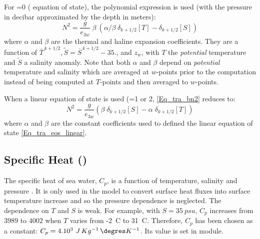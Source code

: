 For =0 (\citet{JackMcD1995} equation of state), the \citet{McDougall1987} 
polynomial expression is used (with the pressure in decibar approximated by 
the depth in meters): 
\begin{equation} \label{Eq_tra_bn2}
N^2 = \frac{g}{e_{3w}} \; \beta   \ 
	   \left(  \alpha / \beta \ \delta_{k+1/2}[T]     - \delta_{k+1/2}[S]   \right) 
\end{equation} 
where $\alpha$ and $\beta$ are the thermal and haline expansion coefficients. 
They are a function of  $\overline{T}^{\,k+1/2},\widetilde{S}=\overline{S}^{\,k+1/2} - 35.$, 
and  $z_w$, with $T$ the \textit{potential} temperature and $\widetilde{S}$ a salinity anomaly. 
Note that both $\alpha$ and $\beta$ depend on \textit{potential} 
temperature and salinity which are averaged at $w$-points prior 
to the computation instead of being computed at $T$-points and 
then averaged to $w$-points.

When a linear equation of state is used (=1 or 2, 
\eqref{Eq_tra_bn2} reduces to:
\begin{equation} \label{Eq_tra_bn2_linear}
N^2 =	\frac{g}{e_{3w}} \left(   \beta \;\delta_{k+1/2}[S] - \alpha \;\delta_{k+1/2}[T]   \right)
\end{equation} 
where $\alpha$ and $\beta $ are the constant coefficients used to 
defined the linear equation of state \eqref{Eq_tra_eos_linear}.

\subsection   	[Specific Heat (\textit{phycst})]
			{Specific Heat ()}
\label{TRA_adv_ldf}

The specific heat of sea water, $C_p$, is a function of temperature, salinity 
and pressure \citep{UNESCO1983}. It is only used in the model to convert 
surface heat fluxes into surface temperature increase and so the pressure 
dependence is neglected. The dependence on $T$ and $S$ is weak. 
For example, with $S=35~psu$, $C_p$ increases from $3989$ to $4002$ 
when $T$ varies from -2~\degres C to 31~\degres C. Therefore, $C_p$ has 
been chosen as a constant: $C_p=4.10^3~J\,Kg^{-1}\,\degres K^{-1}$. 
Its value is set in \mdl{phycst} module. 


